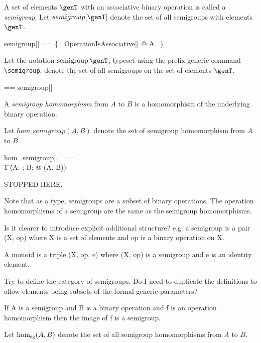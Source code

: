 \documentclass{amsart}
\begin{document}
A set of elements $\genT$ with an associative binary operation is called a \textit{semigroup}.
Let $semigroup[\genT]$ denote the set of all semigroups with elements $\genT$.

\begin{zed}
	semigroup[\genT] == \{~ OperationIsAssociative[\genT] @ A  ~\}
\end{zed}

Let the notation $\semigroup \genT$, typeset using the prefix generic command \verb|\semigroup|,
denote the set of all semigroups on the set of elements $\genT$.

\begin{zed}
	\semigroup \genT == semigroup[\genT]
\end{zed}

\begin{remark}
\begin{zed}
	\semigroup \setT \subseteq \binop \setT
\end{zed}
\end{remark}

A \textit{semigroup homomorphism} from $A$ to $B$ is a homomorphism of the underlying binary operation.

Let $hom\_semigroup(A,B)$ denote the set of semigroup homomorphism from $A$ to $B$.

\begin{zed}
	hom\_semigroup[\setT, \setU] == \\
	\t1	(\lambda A: \semigroup \setT; B: \semigroup \setU @ \homBinOp(A, B))
\end{zed}

STOPPED HERE.

Note that as a type, semigroups are a subset of binary operations.
The operation homomorphisms of a semigroup are the same as the semigroup homomorphisms.

Is it clearer to introduce explicit additional structure?
e.g. a semigroup is a pair (X, op) where X is a set of elements and op is a binary operation on X.

A monoid is a triple (X, op, e) where (X, op) is a semigroup and e is an identity element.

Try to define the category of semigroups. Do I need to duplicate the definitions to allow elements being subsets of the formal generic parameters?

If A is a semigroup and B is a binary operation and f is an operation homomorphism then the image of f is a semigroup.

Let $\operatorname{hom_{sg}}(A, B)$ denote the set of all semigroup homomorphisms from $A$ to $B$.
\end{document}
